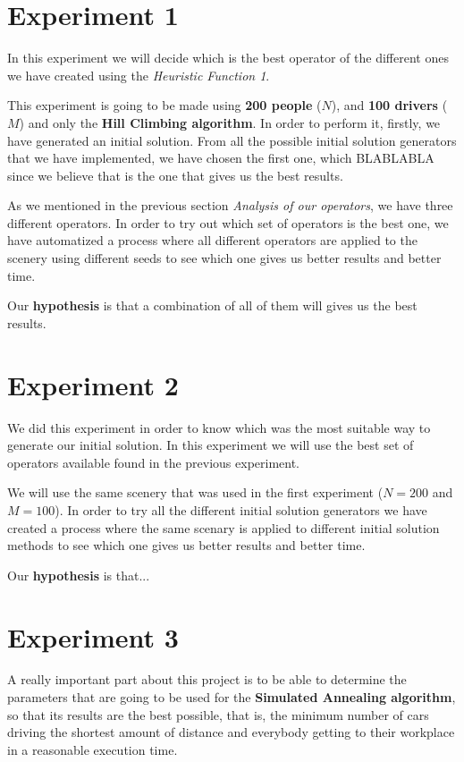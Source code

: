 \documentclass[12]{article}
\begin{document}
\section{Experiment 1}
In this experiment we will decide which is the best operator of the different ones we have created using the \textit{Heuristic Function 1}. 
\\
\medskip 

This experiment is going to be made using \textbf{200 people }($N$), and \textbf{100 drivers }($M$) and only the \textbf{Hill Climbing algorithm}. In order to perform it, firstly, we have generated an initial solution. From all the possible initial solution generators that we have implemented, we have chosen the first one, which BLABLABLA since we believe that is the one that gives us the best results. 

As we mentioned in the previous section \textit{Analysis of our operators}, we have three different operators. In order to try out which set of operators is the best one, we have automatized a process where all different operators are applied to the scenery using different seeds to see which one gives us better results and better time. 

Our \textbf{hypothesis} is that a combination of all of them will gives us the best results. 


\section{Experiment 2}
We did this experiment in order to know which was the most suitable way to generate our initial solution. In this experiment we will use the best set of operators available found in the previous experiment.

We will use the same scenery that was used in the first experiment ($N=200$ and $M=100$).  In order to try all the different initial solution generators we have created a process where the same scenary is applied to different initial solution methods to see which one gives us better results and better time. 

Our \textbf{hypothesis} is that...


\section{Experiment 3}

A really important part about this project is to be able to determine the parameters that are going to be used for the \textbf{Simulated Annealing algorithm}, so that its results are the best possible, that is, the minimum number of cars driving the shortest amount of distance and everybody getting to their workplace in a reasonable execution time. 
\\
\medskip
\end{document}
